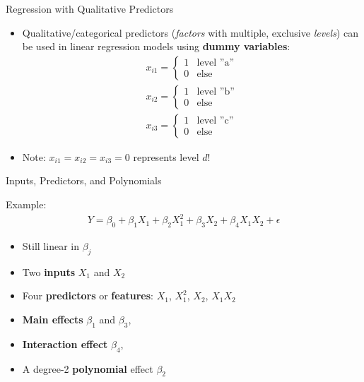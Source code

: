 \documentclass[ignorenonframetext,xcolor=x11names]{beamer}
\begin{document}
\begin{frame}[label=full]{Regression with Qualitative Predictors}
\begin{itemize}
  \item Qualitative/categorical predictors (\emph{factors} with multiple, exclusive \emph{levels}) can be used in linear regression models using \textbf{dummy variables}:
\begin{align*}
x_{i1} = \begin{cases}
1 & \text{level ''a''} \\
0 & \text{else}
\end{cases} \\
x_{i2} = \begin{cases}
1 & \text{level ''b''} \\
0 & \text{else}
\end{cases} \\
x_{i3} = \begin{cases}
1 & \text{level ''c''} \\
0 & \text{else}
\end{cases}
\end{align*}
\item Note: $x_{i1} = x_{i2} = x_{i3} = 0$ represents level $d$!
\end{itemize}
\end{frame}

\begin{frame}[label=full]{Inputs, Predictors, and Polynomials}

Example:
\begin{align*}
Y = \beta_0 + \beta_1 X_1 + \beta_2 X_1^2 + \beta_3 X_2 + \beta_4 X_1 X_2 + \epsilon
\end{align*}
\begin{itemize}
  \item Still linear in $\beta_j$
  \item Two \textbf{inputs} $X_1$ and $X_2$
  \item Four \textbf{predictors} or \textbf{features}: $X_1$, $X_1^2$, $X_2$, $X_1 X_2$
  \item \textbf{Main effects} $\beta_1$ and $\beta_3$, 
  \item \textbf{Interaction effect} $\beta_4$, 
  \item A degree-2 \textbf{polynomial} effect $\beta_2$
\end{itemize}
\end{frame}
\end{document}
